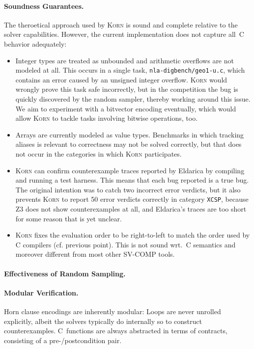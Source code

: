 \documentclass{llncs}
\newcommand{\Korn}{\textsc{Korn}\xspace}
\begin{document}
\paragraph{Soundness Guarantees.}
The theroetical approach used by \Korn is sound and complete
relative to the solver capabilities.
However, the current implementation does not capture all~C behavior adequately:
\begin{itemize}
\item Integer types are treated as unbounded and arithmetic overflows are not modeled at all.
 This occurs in a single task, \texttt{nla-digbench/geo1-u.c},
 which contains an error caused by an unsigned integer overflow.
 \Korn would wrongly prove this task safe incorrectly,
 but in the competition the bug is quickly discovered by the random sampler,
 thereby working around this issue.
 We aim to experiment with a bitvector encoding eventually,
 which would allow \Korn to tackle tasks involving bitwise operations, too.
\item Arrays are currently modeled as value types.
 Benchmarks in which tracking aliases is relevant to correctness
 may not be solved correctly, but that does not occur in the categories in which \Korn participates.
\item \Korn can confirm counterexample traces reported by Eldarica by compiling and running a test harness.
 This means that each bug reported is a true bug.
 The original intention was to catch two incorrect error verdicts,
 but it also prevents \Korn to report 50 error verdicts correctly in category \texttt{XCSP},
 because Z3 does not show counterexamples at all,
 and Eldarica's traces are too short for some reason that is yet unclear.
\item
 \Korn fixes the evaluation order to be right-to-left to match
 the order used by C compilers (cf. previous point).
 This is not sound wrt.~C semantics and moreover different from most other SV-COMP tools.
\end{itemize}

\paragraph{Effectiveness of Random Sampling.}


\paragraph{Modular Verification.}
Horn clause encodings are inherently modular:
Loops are never unrolled explicitly,
albeit the solvers typically do internally so to construct counterexamples.
C~functions are always abstracted in terms of contracts,
consisting of a pre-/postcondition pair.
\end{document}

